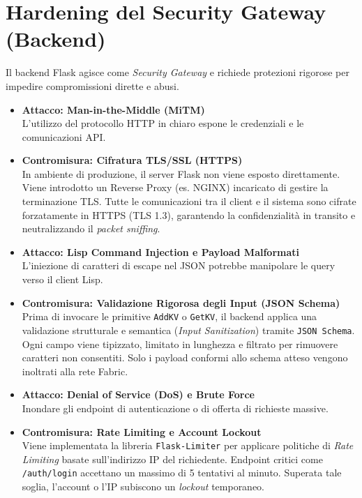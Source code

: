 \section{Hardening del Security Gateway (Backend)}

Il backend Flask agisce come \textit{Security Gateway} e richiede protezioni rigorose per impedire compromissioni dirette e abusi.

\begin{itemize}
    \item \textbf{Attacco: Man-in-the-Middle (MiTM)}\\
    L'utilizzo del protocollo HTTP in chiaro espone le credenziali e le comunicazioni API.
    \item \textbf{Contromisura: Cifratura TLS/SSL (HTTPS)}\\
    In ambiente di produzione, il server Flask non viene esposto direttamente. Viene introdotto un Reverse Proxy (es. NGINX) incaricato di gestire la terminazione TLS. Tutte le comunicazioni tra il client e il sistema sono cifrate forzatamente in HTTPS (TLS 1.3), garantendo la confidenzialità in transito e neutralizzando il \textit{packet sniffing}.
    
    \item \textbf{Attacco: Lisp Command Injection e Payload Malformati}\\
    L'iniezione di caratteri di escape nel JSON potrebbe manipolare le query verso il client Lisp.
    \item \textbf{Contromisura: Validazione Rigorosa degli Input (JSON Schema)}\\
    Prima di invocare le primitive \texttt{AddKV} o \texttt{GetKV}, il backend applica una validazione strutturale e semantica (\textit{Input Sanitization}) tramite \texttt{JSON Schema}. Ogni campo viene tipizzato, limitato in lunghezza e filtrato per rimuovere caratteri non consentiti. Solo i payload conformi allo schema atteso vengono inoltrati alla rete Fabric.
    
    \item \textbf{Attacco: Denial of Service (DoS) e Brute Force}\\
    Inondare gli endpoint di autenticazione o di offerta di richieste massive.
    \item \textbf{Contromisura: Rate Limiting e Account Lockout}\\
    Viene implementata la libreria \texttt{Flask-Limiter} per applicare politiche di \textit{Rate Limiting} basate sull'indirizzo IP del richiedente. Endpoint critici come \texttt{/auth/login} accettano un massimo di 5 tentativi al minuto. Superata tale soglia, l'account o l'IP subiscono un \textit{lockout} temporaneo.
\end{itemize}

